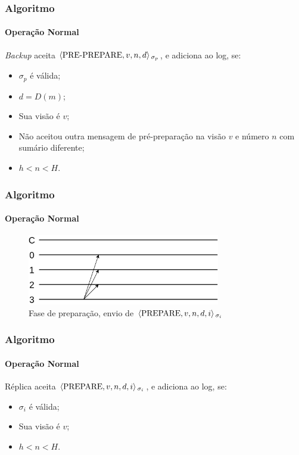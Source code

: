 \documentclass{beamer}
\begin{document}
\begin{frame}
  \frametitle{Algoritmo}
  \framesubtitle{Operação Normal}

  \textit{Backup} aceita $\braket{\text{PRE-PREPARE}, v, n, d}{}_{\sigma_p}$, e adiciona ao log, se:
  \begin{itemize}
    \item
      $\sigma_p$ é válida;
      
      \pause
    \item
      $d = D(m)$;

      \pause
    \item
      Sua visão é $v$;

      \pause
    \item
      Não aceitou outra mensagem de pré-preparação na visão $v$ e número $n$ com sumário diferente;

      \pause
    \item
      $h < n < H$.
  \end{itemize}
\end{frame}

\begin{frame}
  \frametitle{Algoritmo}
  \framesubtitle{Operação Normal}

  \begin{figure}
    \includegraphics[width=0.75\textwidth]{images/prepare}
    \caption{Fase de preparação, envio de $\braket{\text{PREPARE}, v, n, d, i}{}_{\sigma_i}$}
  \end{figure}
\end{frame}

\begin{frame}
  \frametitle{Algoritmo}
  \framesubtitle{Operação Normal}

  Réplica aceita $\braket{\text{PREPARE}, v, n, d, i}{}_{\sigma_i}$, e adiciona ao log, se:
  \begin{itemize}
    \item
      $\sigma_i$ é válida;

    \item
      Sua visão é $v$;

    \item
      $h < n < H$.
  \end{itemize}
\end{frame}
\end{document}
